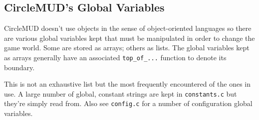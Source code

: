 \documentclass[11pt]{article}
\begin{document}
\subsection{CircleMUD's Global Variables}
CircleMUD doesn't use objects in the sense of object-oriented languages so there are various global variables kept that must be manipulated in order to change the game world.  Some are stored as arrays; others as lists.  The global variables kept as arrays generally have an associated
\texttt{top\_of\_...} function to denote its boundary.
\par
This is not an exhaustive list but the most frequently encountered of the ones in use.  A large number of global, constant strings are kept in \texttt{constants.c} but they're simply read from.  Also see \texttt{config.c} for a number of configuration global variables.
\end{document}
